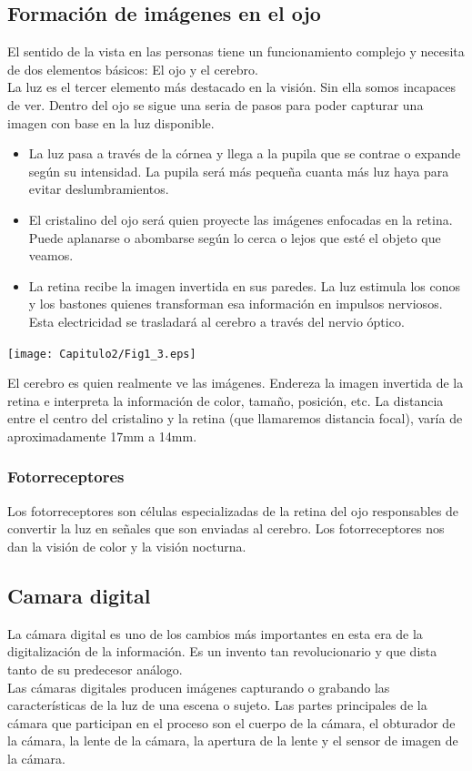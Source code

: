 \subsection{Formación de imágenes en el ojo}
El sentido de la vista en las personas tiene un funcionamiento complejo y 
necesita de dos elementos básicos: El ojo y el cerebro.\\
La luz es el tercer elemento más destacado en la visión. Sin ella somos 
incapaces de ver. Dentro del ojo se sigue una seria de pasos para poder capturar
una imagen con base en la luz disponible.
\begin{itemize}
    \item La luz pasa a través de la córnea y llega a la pupila que se contrae o 
    expande según su intensidad. La pupila será más pequeña cuanta más luz haya para 
    evitar deslumbramientos.
    \item El cristalino del ojo será quien proyecte las imágenes enfocadas en la retina. 
    Puede aplanarse o abombarse según lo cerca o lejos que esté el objeto que veamos.
    \item La retina recibe la imagen invertida en sus paredes. La luz estimula los 
    conos y los bastones quienes transforman esa información en impulsos nerviosos. 
    Esta electricidad se trasladará al cerebro a través del nervio óptico.    
\end{itemize} 
\begin{center}
    \texttt{[image: Capitulo2/Fig1\_3.eps]}       
    \label{Fig1_3}
\end{center}
El cerebro es quien realmente ve las imágenes. Endereza la imagen invertida de la 
retina e interpreta la información de color, tamaño, posición, etc.
La distancia entre el centro del 
cristalino y la retina (que llamaremos distancia focal), varía de 
aproximadamente 17mm a 14mm.~\cite{joseramon2005}
\subsubsection{Fotorreceptores}
Los fotorreceptores son células especializadas de la retina del ojo responsables de 
convertir la luz en señales que son enviadas al cerebro. Los fotorreceptores nos dan 
la visión de color y la visión nocturna.
~\cite{americanacademyofophthalmology2017}
\subsection{Camara digital}
La cámara digital es uno de los cambios más importantes en esta era de la digitalización 
de la información. Es un invento tan revolucionario y que dista tanto de su predecesor 
análogo.\\
Las cámaras digitales producen imágenes capturando o grabando las características de 
la luz de una escena o sujeto. Las partes principales de la cámara que participan en 
el proceso son el cuerpo de la cámara, el obturador de la cámara, la lente de la cámara,
la apertura de la lente y el sensor de imagen de la cámara.
~\cite{easybasicphotography}
